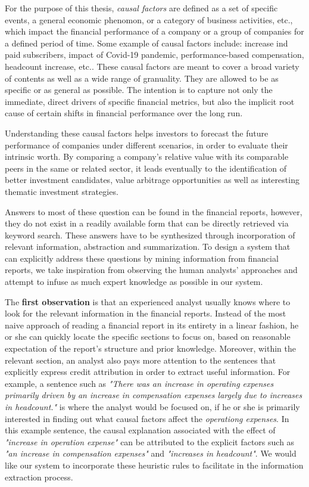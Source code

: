 For the purpose of this thesis, \emph{causal factors} are defined as a set of specific events, a general economic phenomon, or a category of business activities, etc., which impact the financial performance of a company or a group of companies for a defined period of time. Some example of causal factors include: increase ind paid subscribers, impact of Covid-19 pandemic,  performance-based compensation, headcount increase, etc.. These causal factors are meant to cover a broad variety of contents as well as a wide range of granuality. They are allowed to be as specific or as general as possible. The intention is to capture not only the immediate, direct drivers of specific financial metrics, but also the implicit root cause of certain shifts in financial performance over the long run. 

Understanding these causal factors helps investors to forecast the future performance of companies under different scenarios, in order to evaluate their intrinsic worth. By comparing a company's relative value with its comparable peers in the same or related sector, it leads eventually to the identification of better investment candidates, value arbitrage opportunities as well as interesting thematic investment strategies. 

Answers to most of these question can be found in the financial reports, however, they do not exist in a readily available form that can be directly retrieved via keyword search. These answers have to be synthesized through incorporation of relevant information, abstraction and summarization. To design a system that can explicitly address these questions by mining information from financial reports, we take inspiration from observing the human analysts' approaches and attempt to infuse as much expert knowledge as possible in our system. 

The \textbf{first observation} is that an experienced analyst usually knows where to look for the relevant information in the financial reports. Instead of the most naive approach of reading a financial report in its entirety in a linear fashion, he or she can quickly locate the specific sections to focus on, based on reasonable expectation of the report's structure and prior knowledge. Moreover, within the relevant section, an analyst also pays more attention to the sentences that explicitly express credit attribution in order to extract useful information. For example, a sentence such as \emph{"There was an increase in operating expenses primarily driven by an increase in compensation expenses largely due to increases in headcount."} is where the analyst would be focused on, if he or she is primarily interested in finding out what causal factors affect the \emph{operationg expenses}. In this example sentence, the causal explanation associated with the effect of \emph{"increase in operation expense"} can be attributed to the explicit factors such as \emph{"an increase in compensation expenses"} and \emph{"increases in headcount"}. We would like our system to incorporate these heuristic rules to facilitate in the information extraction process.

